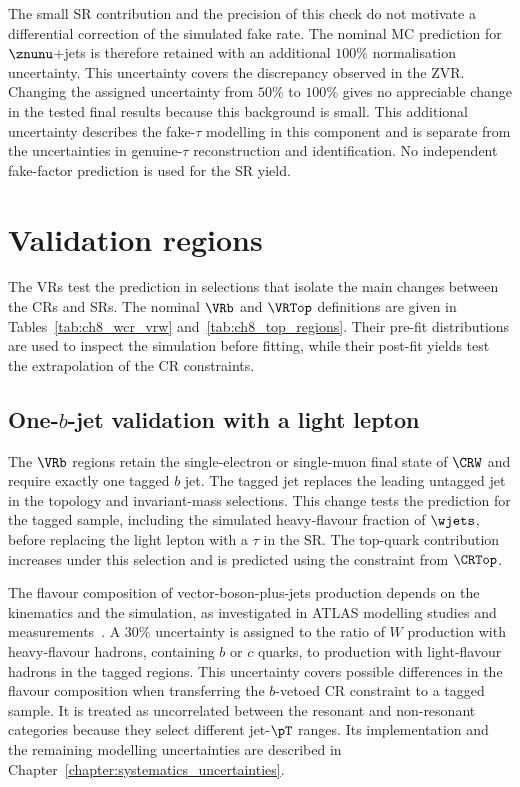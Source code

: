The small SR contribution and the precision of this check do not motivate a differential correction of the simulated fake rate.
The nominal MC prediction for $\znunu$+jets is therefore retained with an additional $100\%$ normalisation uncertainty.
This uncertainty covers the discrepancy observed in the ZVR.
Changing the assigned uncertainty from $50\%$ to $100\%$ gives no appreciable change in the tested final results because this background is small.
This additional uncertainty describes the fake-$\tau$ modelling in this component and is separate from the uncertainties in genuine-$\tau$ reconstruction and identification.
No independent fake-factor prediction is used for the SR yield.


\clearpage
\section{Validation regions}
\label{sec:ch8_validation}

The VRs test the prediction in selections that isolate the main changes between the CRs and SRs.
The nominal $\VRb$ and $\VRTop$ definitions are given in Tables~\ref{tab:ch8_wcr_vrw} and~\ref{tab:ch8_top_regions}.
Their pre-fit distributions are used to inspect the simulation before fitting, while their post-fit yields test the extrapolation of the CR constraints.

\subsection[One b-jet validation with a light lepton]{One-$b$-jet validation with a light lepton}
\label{subsec:ch8_vrw}

The $\VRb$ regions retain the single-electron or single-muon final state of $\CRW$ and require exactly one tagged $b$ jet.
The tagged jet replaces the leading untagged jet in the topology and invariant-mass selections.
This change tests the prediction for the tagged sample, including the simulated heavy-flavour fraction of $\wjets$, before replacing the light lepton with a $\tau$ in the SR.
The top-quark contribution increases under this selection and is predicted using the constraint from $\CRTop$.

The flavour composition of vector-boson-plus-jets production depends on the kinematics and the simulation, as investigated in ATLAS modelling studies and measurements~\cite{PMGR-2021-01,STDM-2018-43,HIGG-2020-20}.
A $30\%$ uncertainty is assigned to the ratio of $W$ production with heavy-flavour hadrons, containing $b$ or $c$ quarks, to production with light-flavour hadrons in the tagged regions.
This uncertainty covers possible differences in the flavour composition when transferring the $b$-vetoed CR constraint to a tagged sample.
It is treated as uncorrelated between the resonant and non-resonant categories because they select different jet-$\pT$ ranges.
Its implementation and the remaining modelling uncertainties are described in Chapter~\ref{chapter:systematics_uncertainties}.

